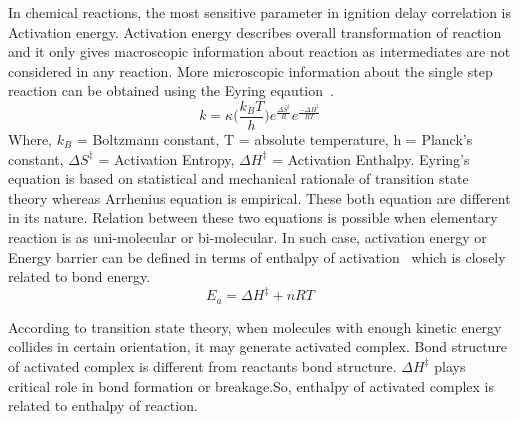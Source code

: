 \documentclass[preprint,12pt]{elsarticle}
\begin{document}
		In chemical reactions, the most sensitive parameter in ignition delay correlation is Activation energy. Activation energy describes overall transformation of reaction and it only gives macroscopic information about reaction as intermediates are not considered in any reaction. More microscopic information about the single step reaction can be obtained using the Eyring eqaution~\cite{modernbook}.
		\begin{equation}\label{eyring}
		k = \kappa\bigg( \frac{k_BT}{h} \bigg) e^{\frac{\Delta S^{\ddagger}}{R}} e^{\frac{-\Delta H^{\ddagger}}{RT}}
		\end{equation} 
		Where, $k_B$ = Boltzmann constant, T = absolute temperature, h = Planck's constant, $\Delta S^{\ddagger}$ = Activation Entropy, $\Delta H^{\ddagger}$ = Activation Enthalpy. Eyring's equation is based on statistical and mechanical rationale of transition state theory whereas Arrhenius equation is empirical. These both equation are different in its nature. Relation between these two equations is possible when elementary reaction is as uni-molecular or bi-molecular. In such case, activation energy or  Energy barrier can be defined in terms of enthalpy of activation~\cite{modernbook} which is closely related to bond energy.
		\begin{equation}\label{acti_entha}
		E_a = \Delta H^{\ddagger} + nRT
		\end{equation}
		
		 According to transition state theory, when molecules with enough kinetic energy collides in certain orientation, it may generate activated complex. Bond structure of activated complex  is different from reactants bond structure. $\Delta H^{\ddagger}$ plays critical role in bond formation or breakage.So, enthalpy of activated complex is related to enthalpy of reaction. 
		 
\end{document}
